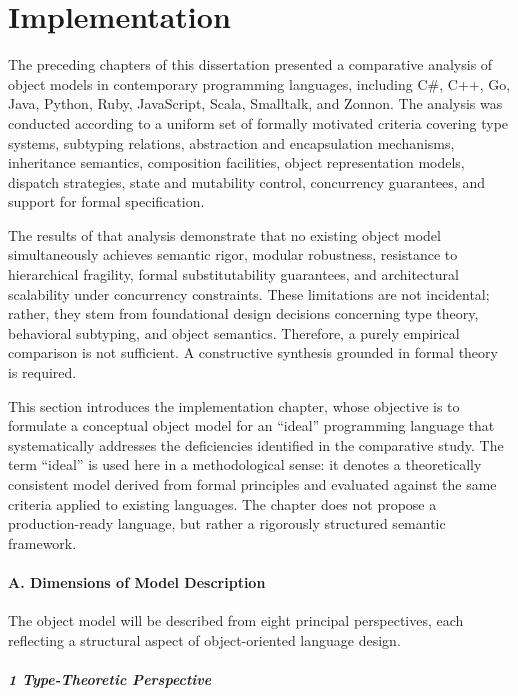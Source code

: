 \chapter{Implementation}
\label{chap:impl}

The preceding chapters of this dissertation presented a comparative analysis of object models in contemporary programming languages, including C\#, C++, Go, Java, Python, Ruby, JavaScript, Scala, Smalltalk, and Zonnon. The analysis was conducted according to a uniform set of formally motivated criteria covering type systems, subtyping relations, abstraction and encapsulation mechanisms, inheritance semantics, composition facilities, object representation models, dispatch strategies, state and mutability control, concurrency guarantees, and support for formal specification. 

The results of that analysis demonstrate that no existing object model simultaneously achieves semantic rigor, modular robustness, resistance to hierarchical fragility, formal substitutability guarantees, and architectural scalability under concurrency constraints. These limitations are not incidental; rather, they stem from foundational design decisions concerning type theory, behavioral subtyping, and object semantics. Therefore, a purely empirical comparison is not sufficient. A constructive synthesis grounded in formal theory is required.

This section introduces the implementation chapter, whose objective is to formulate a conceptual object model for an ``ideal'' programming language that systematically addresses the deficiencies identified in the comparative study. The term ``ideal'' is used here in a methodological sense: it denotes a theoretically consistent model derived from formal principles and evaluated against the same criteria applied to existing languages. The chapter does not propose a production-ready language, but rather a rigorously structured semantic framework.

\subsubsection{A. Dimensions of Model Description}

The object model will be described from eight principal perspectives, each reflecting a structural aspect of object-oriented language design.

\paragraph{1 Type-Theoretic Perspective}

